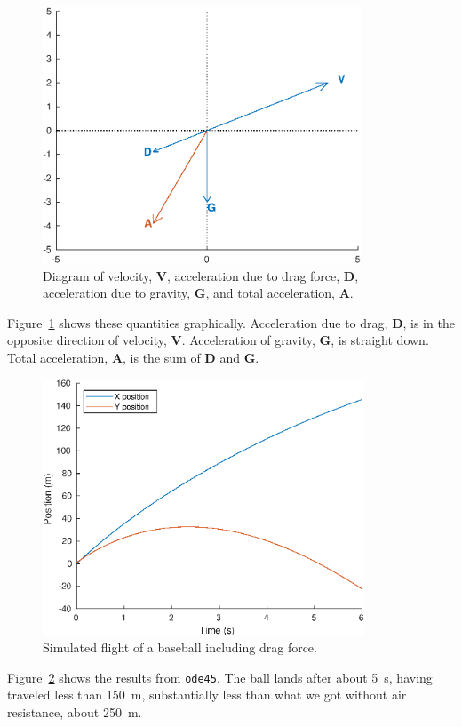 \documentclass[
]{book}
\numberwithin{Answer}{chapter}
\numberwithin{Exercise}{chapter}
\renewcommand{\vec}[1]{\bm{\mathbf{#1}}}
\begin{document}
\begin{figure}
\centerline{\includegraphics[height=3in]{book/figs/vector3.eps}}
\caption{Diagram of velocity, $\vec{V}$, acceleration due to drag force, 
$\vec{D}$, acceleration due to gravity, $\vec{G}$, and total acceleration, $\vec{A}$.}
\label{fig:vector3}
\end{figure}

Figure~\ref{fig:vector3} shows these quantities graphically.  Acceleration due to drag, $\vec{D}$, is in the opposite direction of velocity, $\vec{V}$.  Acceleration of gravity, $\vec{G}$, is straight down.  Total acceleration, $\vec{A}$, is the sum of $\vec{D}$ and $\vec{G}$.


\begin{figure}
\centerline{\includegraphics[height=3in]{book/figs/baseball2.eps}}
\caption{Simulated flight of a baseball including drag force.}
\label{fig:baseball2}
\end{figure}

Figure~\ref{fig:baseball2} shows the results from {\tt ode45}.  The ball lands after about \SI{5}{\second}, having traveled less than \SI{150}{\meter}, substantially less than what we got without air resistance, about \SI{250}{\meter}.
\end{document}
